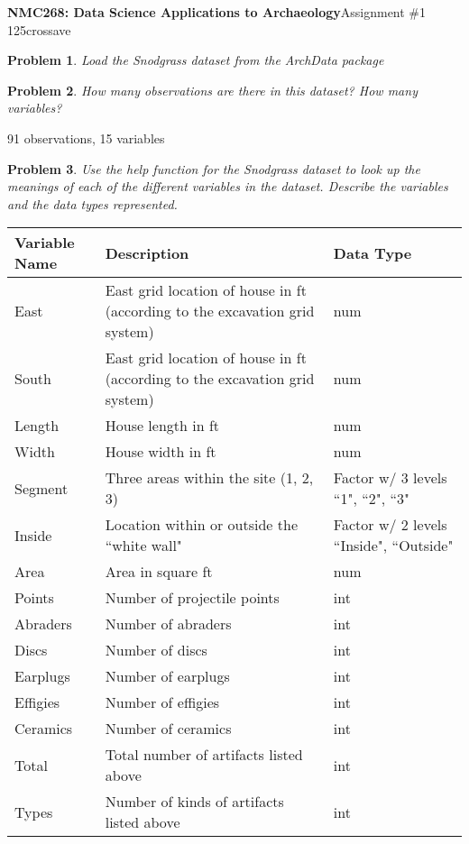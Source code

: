 \documentclass[12pt]{article}
\newtheorem{problem}{Problem}
\begin{document}
\pagecolor{opp}
\noindent \textbf{NMC268: Data Science Applications to Archaeology}\hfill Assignment \#1\\
\color{nr}125crossave\color{black}

\hrulefill


\begin{problem}
Load the Snodgrass dataset from the ArchData package
\end{problem}

\begin{problem}
How many observations are there in this dataset? How many variables?
\end{problem}
\color{nr}
91 observations, 15 variables
\color{black}
\begin{problem}
    Use the help function for the Snodgrass dataset to look up the meanings of each of the different
variables in the dataset. Describe the variables and the data types represented.
\end{problem}
\color{nr}
 \begin{center}
     \begin{tabularx}{0.8\textwidth} {
  | >{\raggedright\arraybackslash}X
  | >{\centering\arraybackslash}X
  | >{\raggedleft\arraybackslash}X | }
 \hline
 \textbf{Variable Name} & \textbf{Description} & \textbf{Data Type} \\
 \hline
 East  & East grid location of house in ft (according to the excavation grid system) & num \\
 \hline
 South & East grid location of house in ft (according to the excavation grid system) & num\\
 \hline
 Length & House length in ft & num\\
 \hline
 Width & House width in ft & num\\
  \hline
 Segment & Three areas within the site (1, 2, 3) & Factor w/ 3 levels ``1", ``2", ``3"\\
  \hline
 Inside & Location within or outside the ``white wall" & Factor w/ 2 levels ``Inside", ``Outside"\\
  \hline
 Area & Area in square ft & num\\
 \hline
 Points & Number of projectile points & int\\
  \hline
 Abraders & Number of abraders & int\\
  \hline
 Discs & Number of discs & int\\
  \hline
 Earplugs & Number of earplugs & int\\
  \hline
 Effigies & Number of effigies & int\\
  \hline
 Ceramics & Number of ceramics & int\\
  \hline
 Total & Total number of artifacts listed above & int\\
  \hline
 Types & Number of kinds of artifacts listed above & int\\
 \hline
\end{tabularx}
\end{center}
\end{document}

